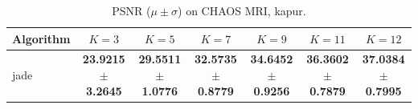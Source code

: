 \begin{table}[htbp]
\centering
\caption{PSNR ($\mu \pm \sigma$) on CHAOS MRI, kapur.}
\label{tab:exp2-kapur-psnr}
\begin{tabular}{lcccccc}
\toprule
Algorithm & $K=3$ & $K=5$ & $K=7$ & $K=9$ & $K=11$ & $K=12$ \\
\midrule
jade & \textbf{23.9215 $\pm$ 3.2645} & \textbf{29.5511 $\pm$ 1.0776} & \textbf{32.5735 $\pm$ 0.8779} & \textbf{34.6452 $\pm$ 0.9256} & \textbf{36.3602 $\pm$ 0.7879} & \textbf{37.0384 $\pm$ 0.7995} \\
\bottomrule
\end{tabular}
\end{table}